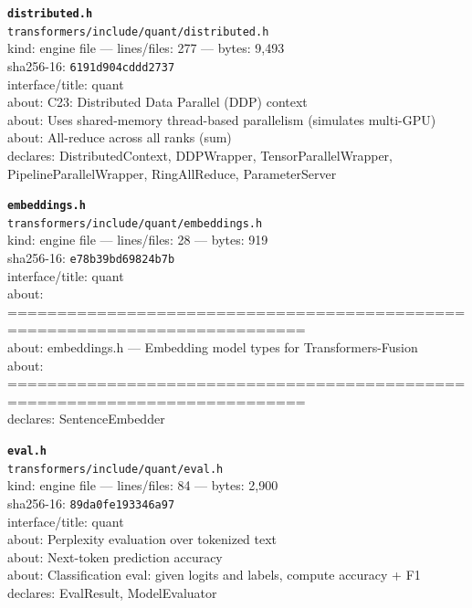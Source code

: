 \noindent\textbf{\texttt{distributed.h}}\\
\texttt{transformers/include/quant/distributed.h}\\
kind: engine file --- lines/files: 277 --- bytes: 9,493\\
sha256-16: \texttt{6191d904cddd2737}\\
interface/title: quant\\
about: C23: Distributed Data Parallel (DDP) context\\
about: Uses shared-memory thread-based parallelism (simulates multi-GPU)\\
about: All-reduce across all ranks (sum)\\
declares: DistributedContext, DDPWrapper, TensorParallelWrapper, PipelineParallelWrapper, RingAllReduce, ParameterServer\\
\vspace*{6.0pt}

\noindent\textbf{\texttt{embeddings.h}}\\
\texttt{transformers/include/quant/embeddings.h}\\
kind: engine file --- lines/files: 28 --- bytes: 919\\
sha256-16: \texttt{e78b39bd69824b7b}\\
interface/title: quant\\
about: ============================================================================\\
about: embeddings.h — Embedding model types for Transformers-Fusion\\
about: ============================================================================\\
declares: SentenceEmbedder\\
\vspace*{6.0pt}

\noindent\textbf{\texttt{eval.h}}\\
\texttt{transformers/include/quant/eval.h}\\
kind: engine file --- lines/files: 84 --- bytes: 2,900\\
sha256-16: \texttt{89da0fe193346a97}\\
interface/title: quant\\
about: Perplexity evaluation over tokenized text\\
about: Next-token prediction accuracy\\
about: Classification eval: given logits and labels, compute accuracy + F1\\
declares: EvalResult, ModelEvaluator\\
\vspace*{6.0pt}
\newpage

